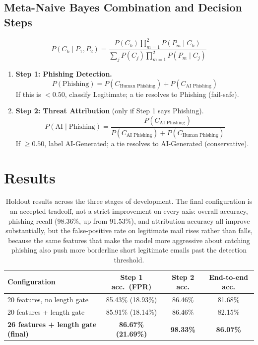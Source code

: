 \documentclass[11pt]{article}
\begin{document}
\subsection{Meta-Naive Bayes Combination and Decision Steps}
\begin{equation}
    P(C_k \mid P_1, P_2) = \frac{P(C_k)\prod_{m=1}^{2} P(P_m \mid C_k)}{\sum_j P(C_j)\prod_{m=1}^{2} P(P_m \mid C_j)}
    \label{eq:metanb}
\end{equation}
\begin{enumerate}
    \item \textbf{Step 1: Phishing Detection.}
    \[ P(\text{Phishing}) = P(C_{\text{Human Phishing}}) + P(C_{\text{AI Phishing}}) \]
    If this is $< 0.50$, classify Legitimate; a tie resolves to Phishing (fail-safe).
    \item \textbf{Step 2: Threat Attribution} (only if Step 1 says Phishing).
    \[ P(\text{AI} \mid \text{Phishing}) = \frac{P(C_{\text{AI Phishing}})}{P(C_{\text{AI Phishing}}) + P(C_{\text{Human Phishing}})} \]
    If $\geq 0.50$, label AI-Generated; a tie resolves to AI-Generated (conservative).
\end{enumerate}

\section{Results}
\label{sec:results}
\begin{table}[h]
\centering
\begin{tabular}{@{}lccc@{}}
\toprule
Configuration & Step 1 acc.\ (FPR) & Step 2 acc. & End-to-end acc. \\
\midrule
20 features, no length gate & 85.43\% (18.93\%) & 86.46\% & 81.68\% \\
20 features + length gate & 85.91\% (18.14\%) & 86.46\% & 82.15\% \\
\textbf{26 features + length gate (final)} & \textbf{86.67\% (21.69\%)} & \textbf{98.33\%} & \textbf{86.07\%} \\
\bottomrule
\end{tabular}
\caption{Holdout results across the three stages of development. The final configuration is an
accepted tradeoff, not a strict improvement on every axis: overall accuracy, phishing recall
(98.36\%, up from 91.53\%), and attribution accuracy all improve substantially, but the
false-positive rate on legitimate mail rises rather than falls, because the same features that
make the model more aggressive about catching phishing also push more borderline short legitimate
emails past the detection threshold.}
\label{tab:results}
\end{table}
\end{document}
